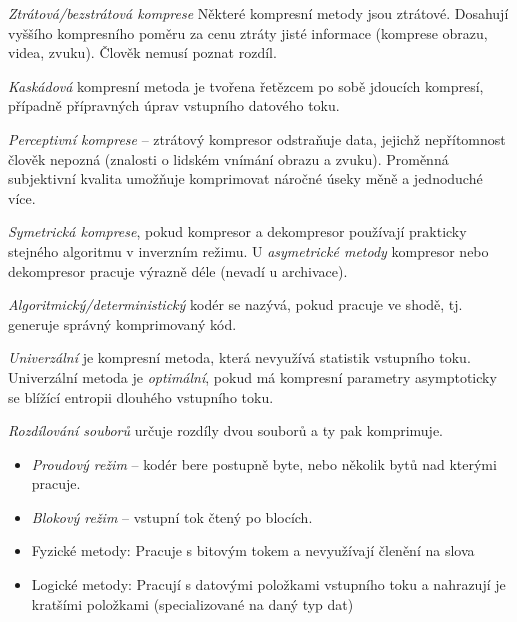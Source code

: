 \documentclass[a4paper, 11pt]{report}
\begin{document}
\emph{Ztrátová/bezstrátová komprese} Některé kompresní metody jsou ztrátové. Dosahují vyššího kompresního poměru za cenu ztráty jisté informace (komprese obrazu, videa, zvuku). Člověk nemusí poznat rozdíl.

\emph{Kaskádová} kompresní metoda je tvořena řetězcem po sobě jdoucích kompresí, případně přípravných úprav vstupního datového toku.

\emph{Perceptivní komprese} -- ztrátový kompresor odstraňuje data, jejichž nepřítomnost člověk nepozná (znalosti o lidském vnímání obrazu a zvuku). Proměnná subjektivní kvalita umožňuje komprimovat náročné úseky měně a jednoduché více.

\emph{Symetrická komprese}, pokud kompresor a dekompresor používají prakticky stejného algoritmu v inverzním režimu. U \emph{asymetrické metody} kompresor nebo dekompresor pracuje výrazně déle (nevadí u archivace).

\emph{Algoritmický/deterministický} kodér se nazývá, pokud pracuje ve shodě, tj. generuje správný komprimovaný kód.

\emph{Univerzální} je kompresní metoda, která nevyužívá statistik vstupního toku. Univerzální metoda je \emph{optimální}, pokud má kompresní parametry asymptoticky se blížící entropii dlouhého vstupního toku.

\emph{Rozdílování souborů} určuje rozdíly dvou souborů a ty pak komprimuje.

\begin{itemize}
	\item \emph{Proudový režim} -- kodér bere postupně byte, nebo několik bytů nad kterými pracuje.
	\item \emph{Blokový režim} -- vstupní tok čtený po blocích.
\end{itemize}

\begin{itemize}
	\item Fyzické metody: Pracuje s bitovým tokem a nevyužívají členění na slova
	\item Logické metody: Pracují s datovými položkami vstupního toku a nahrazují je kratšími položkami (specializované na daný typ dat)
\end{itemize}
\end{document}
